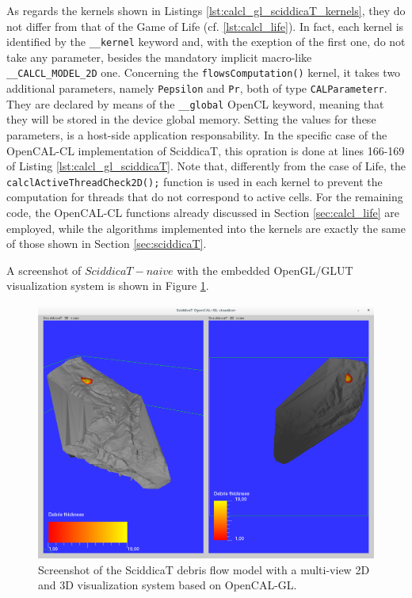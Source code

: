 As regards the kernels shown in Listings
\ref{lst:calcl_gl_sciddicaT_kernels}, they do not differ from that of
the Game of Life (cf. \ref{lst:calcl_life}). In fact, each kernel is
identified by the \verb'__kernel' keyword and, with the exeption of
the first one, do not take any parameter, besides the mandatory
implicit macro-like \verb'__CALCL_MODEL_2D' one. Concerning the
\verb'flowsComputation()' kernel, it takes two additional parameters,
namely \verb'Pepsilon' and \verb'Pr', both of type
\verb'CALParameterr'. They are declared by means of the
\verb'__global' OpenCL keyword, meaning that they will be stored in
the device global memory. Setting the values for these parameters, is
a host-side application responsability. In the specific case of the
OpenCAL-CL implementation of SciddicaT, this opration is done at lines
166-169 of Listing \ref{lst:calcl_gl_sciddicaT}. Note that,
differently from the case of Life, the
\verb'calclActiveThreadCheck2D();' function is used in each kernel to
prevent the computation for threads that do not correspond to active
cells. For the remaining code, the OpenCAL-CL functions already
discussed in Section \ref{sec:calcl_life} are employed, while the
algorithms implemented into the kernels are exactly the same of those
shown in Section \ref{sec:sciddicaT}.

A screenshot of $SciddicaT-{naive}$ with the embedded OpenGL/GLUT
visualization system is shown in Figure \ref{fig:calgl_sciddicaT2}.

\begin{figure}
  \begin{center}
    \includegraphics[width=12cm]{./images/OpenCAL/calgl_sciddicaT1}
    \caption{Screenshot of the SciddicaT debris flow model with a
      multi-view 2D and 3D visualization system based on OpenCAL-GL.}
    \label{fig:calgl_sciddicaT2}
  \end{center}
\end{figure}


